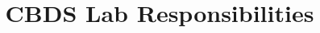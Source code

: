 \documentclass[10pt,a4paper]{article}
\begin{document}
\title{CBDS Lab Responsibilities}
\maketitle





\end{document}
